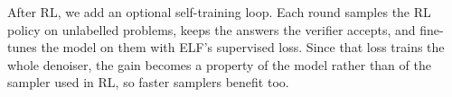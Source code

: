 After RL, we add an optional self-training loop. Each round samples the RL policy on unlabelled problems, keeps the answers the verifier accepts, and fine-tunes the model on them with ELF's supervised loss. Since that loss trains the whole denoiser, the gain becomes a property of the model rather than of the sampler used in RL, so faster samplers benefit too.

